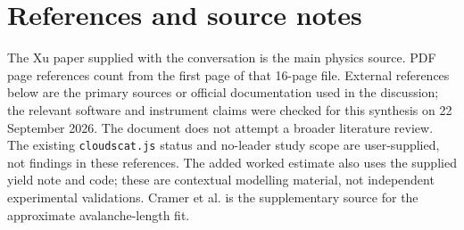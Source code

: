 \documentclass[11pt,a4paper]{article}
\begin{document}
\section*{References and source notes}
{\small
The Xu paper supplied with the conversation is the main physics source. PDF page references count from the first page of that 16-page file. External references below are the primary sources or official documentation used in the discussion; the relevant software and instrument claims were checked for this synthesis on 22 September 2026. The document does not attempt a broader literature review. The existing \texttt{cloudscat.js} status and no-leader study scope are user-supplied, not findings in these references. The added worked estimate also uses the supplied yield note and code; these are contextual modelling material, not independent experimental validations. Cramer et al. is the supplementary source for the approximate avalanche-length fit.
}
\begingroup
\small
\renewcommand{\refname}{}
\end{document}
